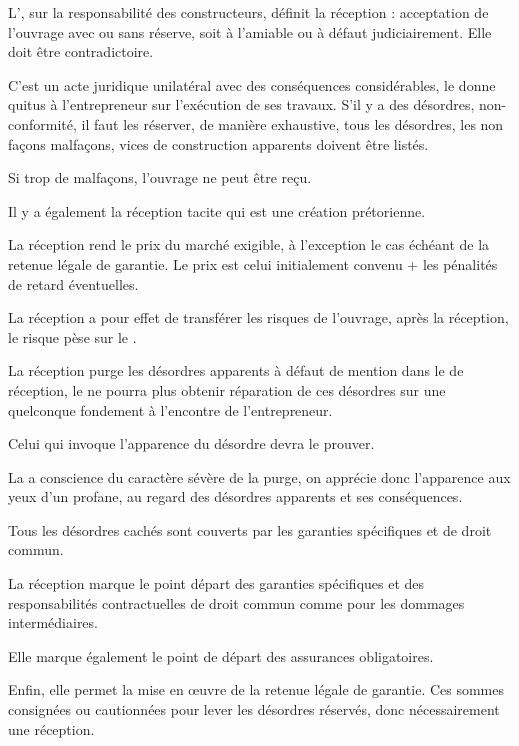 			L’, sur la responsabilité des constructeurs, définit la réception : acceptation de l’ouvrage avec ou sans réserve, soit à l’amiable ou à défaut judiciairement. Elle doit être contradictoire.


			C’est un acte juridique unilatéral avec des conséquences considérables, le \Mo donne quitus à l’entrepreneur sur l’exécution de ses travaux. S’il y a des désordres, non-conformité, il faut les réserver, de manière exhaustive, tous les désordres, les non façons malfaçons, vices de construction apparents doivent être listés.


			Si trop de malfaçons, l’ouvrage ne peut être reçu.


			Il y a également la réception tacite qui est une création prétorienne.


			La réception rend le prix du marché exigible, à l’exception le cas échéant de la retenue légale de garantie. Le prix est celui initialement convenu + les pénalités de retard éventuelles.


			La réception a pour effet de transférer les risques de l’ouvrage, après la réception, le risque pèse sur le \Mo.


			La réception purge les désordres apparents à défaut de mention dans le \pv de réception, le \Mo ne pourra plus obtenir réparation de ces désordres sur une quelconque fondement à l’encontre de l’entrepreneur.


			Celui qui invoque l’apparence du désordre devra le prouver.


			La \jp a conscience du caractère sévère de la purge, on apprécie donc l’apparence aux yeux d’un \Mo profane, au regard des désordres apparents et ses conséquences.


			Tous les désordres cachés sont couverts par les garanties spécifiques et de droit commun.


			La réception marque le point départ des garanties spécifiques et des responsabilités contractuelles de droit commun comme pour les dommages intermédiaires.


			Elle marque également le point de départ des assurances obligatoires.


			Enfin, elle permet la mise en œuvre de la retenue légale de garantie. Ces sommes consignées ou cautionnées pour lever les désordres réservés, donc nécessairement une réception.
